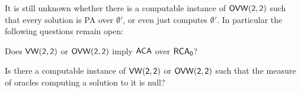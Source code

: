 It is still unknown whether there is a computable instance of $\sf{OVW}(2,2)$ such that every solution is PA over $\emptyset'$, or even just computes $\emptyset'$. In particular the following questions remain open:

\begin{question}
	Does $\sf{VW}(2,2)$ or $\sf{OVW}(2,2)$ imply $\operatorname{\sf{ACA}}$ over $\operatorname{\sf{RCA}_0}$?
\end{question}

\begin{question}
	Is there a computable instance of $\sf{VW}(2,2)$ or $\sf{OVW}(2,2)$ such that the measure of oracles computing a solution to it is null?
\end{question} 